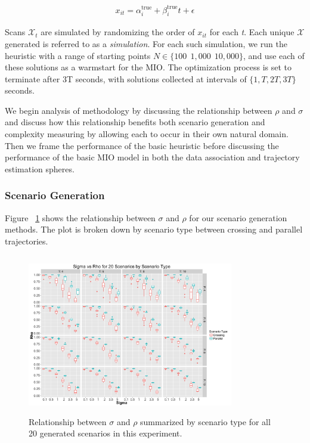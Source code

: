 \documentclass[journal]{IEEEtran}
\begin{document}
\begin{align}
	x_{it} = \alpha^{\text{true}}_{i} + \beta^{\text{true}}_{i}t+\epsilon
\end{align}

Scans $\mathcal{X}_{t}$ are simulated by randomizing the order of $x_{it}$ for each \textit{t}. Each unique $\boldsymbol{\mathcal{X}}$ generated is referred to as a \textit{simulation}. For each such simulation, we run the heuristic with a range of starting points $N \in \{100\ \ 1,000\ \ 10,000\}$, and use each of these solutions as a warmstart for the MIO. The optimization process is set to terminate after 3T seconds, with solutions collected at intervals of $\{1,T,2T,3T\}$ seconds.

We begin analysis of methodology by discussing the relationship between $\rho$ and $\sigma$ and discuss how this relationship benefits both scenario generation and complexity measuring by allowing each to occur in their own natural domain. Then we frame the performance of the basic heuristic before discussing the performance of the basic MIO model in both the data association and trajectory estimation spheres.

\subsubsection{Scenario Generation}
Figure ~\ref{fig:Sigma_vs_Rho} shows the relationship between $\sigma$ and $\rho$ for our scenario generation methods. The plot is broken down by scenario type between crossing and parallel trajectories. 

\begin{figure}[h]
  \centering
  \includegraphics[width=9cm, height=7cm]{Sigma_vs_Rho}
  \caption{Relationship between $\sigma$ and $\rho$ summarized by scenario type for all 20 generated scenarios in this experiment.}
  \label{fig:Sigma_vs_Rho}
\end{figure}
\end{document}

